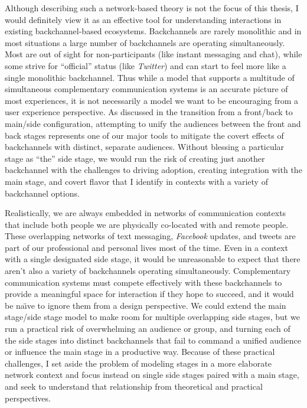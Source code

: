 Although describing such a network-based theory is not the focus of this thesis, I would definitely view it as an effective tool for understanding interactions in existing backchannel-based ecosystems. Backchannels are rarely monolithic and in most situations a large number of backchannels are operating simultaneously. Most are out of sight for non-participants (like instant messaging and chat), while some strive for ``official'' status (like \emph{Twitter}) and can start to feel more like a single monolithic backchannel. Thus while a model that supports a multitude of simultaneous complementary communication systems is an accurate picture of most experiences, it is not necessarily a model we want to be encouraging from a user experience perspective. As discussed in the transition from a front/back to main/side configuration, attempting to unify the audiences between the front and back stages represents one of our major tools to mitigate the covert effects of backchannels with distinct, separate audiences. Without blessing a particular stage as ``the'' side stage, we would run the risk of creating just another backchannel with the challenges to driving adoption, creating integration with the main stage, and covert flavor that I identify in contexts with a variety of backchannel options.

Realistically, we are always embedded in networks of communication contexts that include both people we are physically co-located with and remote people. These overlapping networks of text messaging, \emph{Facebook} updates, and tweets are part of our professional and personal lives most of the time. Even in a context with a single designated side stage, it would be unreasonable to expect that there aren't also a variety of backchannels operating simultaneously. Complementary communication systems must compete effectively with these backchannels to provide a meaningful space for interaction if they hope to succeed, and it would be na\"{\i}ve to ignore them from a design perspective. We could extend the main stage/side stage model to make room for multiple overlapping side stages, but we run a practical risk of overwhelming an audience or group, and turning each of the side stages into distinct backchannels that fail to command a unified audience or influence the main stage in a productive way. Because of these practical challenges, I set aside the problem of modeling stages in a more elaborate network context and focus instead on single side stages paired with a main stage, and seek to understand that relationship from theoretical and practical perspectives.

